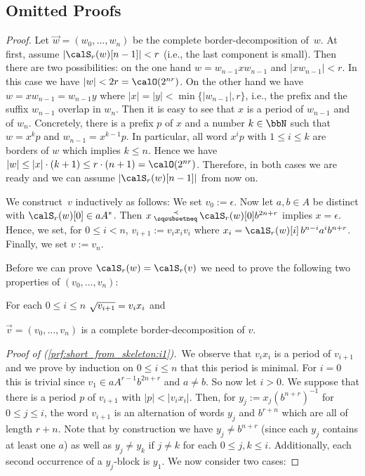 \newpage
\begin{appendix}
	\section{Omitted Proofs}
	\instantiation*
	\begin{proof}
		Let $\vec{w}=(w_0,\dots,w_n)$ be the complete border-decomposition of~$w$. At first, assume $|\calS_r(w)[n-1]|<r$ (i.e., the last component is small). Then there are two possibilities: on the one hand $w=w_{n-1}xw_{n-1}$ and $|xw_{n-1}|<r$. In this case we have $|w|<2r=\calO(2^{nr})$. On the other hand we have $w=xw_{n-1}=w_{n-1}y$ where $|x|=|y|<\min\{|w_{n-1}|,r\}$, i.e., the prefix and the suffix $w_{n-1}$ overlap in $w_n$. Then it is easy to see that $x$ is a period of $w_{n-1}$ and of $w_n$. Concretely, there is a prefix $p$ of $x$ and a number $k\in\bbN$ such that $w=x^kp$ and $w_{n-1}=x^{k-1}p$. In particular, all word $x^ip$ with $1\leq i\leq k$ are borders of $w$ which implies $k\leq n$. Hence we have $|w|\leq|x|\cdot(k+1)\leq r\cdot(n+1)=\calO(2^{nr})$. Therefore, in both cases we are ready and we can assume $|\calS_r(w)[n-1]|$ from now on.
		
		We construct~$v$ inductively as follows: We set $v_0:=\epsilon$. Now let $a,b\in A$ be distinct with $\calS_r(w)[0]\in aA^*$. Then $x\presuf\calS_r(w)[0]b^{2n+r}$ implies $x=\epsilon$. Hence, we set, for $0\leq i<n$, $v_{i+1}:=v_ix_iv_i$ where $x_i=\calS_r(w)[i]\,b^{n-i}a^ib^{n+r}$. Finally, we set $v:=v_{n}$.
		
		Before we can prove $\calS_r(w)=\calS_r(v)$ we need to prove the following two properties of $(v_0,\dots,v_n)$:
		\begin{alphaenumerate}
			\item For each $0\leq i\leq n$ $\sqrt{v_{i+1}}=v_ix_i$ and\label{prf:short_from_skeleton:i1}
			\item $\vec{v}=(v_0,\dots,v_{n})$ is a complete border-decomposition of $v$.\label{prf:short_from_skeleton:i2}
		\end{alphaenumerate}
		\emph{Proof of (\ref{prf:short_from_skeleton:i1}).}\ We observe that $v_ix_i$ is a period of $v_{i+1}$ and we prove by induction on $0\leq i\leq n$ that this period is minimal. For $i=0$ this is trivial since $v_1\in aA^{r-1}b^{2n+r}$ and $a\neq b$. So now let $i>0$. We suppose that there is a period $p$ of $v_{i+1}$ with $|p|<|v_ix_i|$. Then, for $y_j:=x_j(b^{n+r})^{-1}$ for $0\leq j\leq i$, the word $v_{i+1}$ is an alternation of words $y_j$ and $b^{r+n}$ which are all of length $r+n$. Note that by construction we have $y_{j}\neq b^{n+r}$ (since each $y_{j}$ contains at least one $a$) as well as $y_{j}\neq y_{k}$ if $j\neq k$ for each $0\leq j,k\leq i$. Additionally, each second occurrence of a $y_j$-block is $y_1$. We now consider two cases:
		

\end{proof}
\end{appendix}
